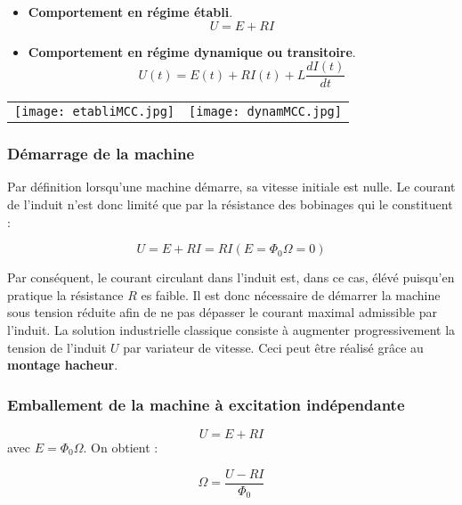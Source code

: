 \documentclass{article}
\begin{document}
\begin{itemize}
    \item \textbf{Comportement en régime établi}. 
    \begin{equation}
        U = E + RI
    \end{equation}
    \item \textbf{Comportement en régime dynamique ou transitoire}. 
    \begin{equation}
        U(t) = E(t) + RI(t) + L \frac{dI (t)}{dt}
    \end{equation}
\end{itemize}


\begin{tabular}{cc}
   \texttt{[image: etabliMCC.jpg]} &
   \texttt{[image: dynamMCC.jpg]} \\
\end{tabular}



\subsubsection{Démarrage de la machine}

Par définition lorsqu'une machine démarre, sa vitesse initiale est nulle. Le courant de l'induit n'est donc limité que par la résistance des bobinages qui le constituent :

\begin{equation}
    U = E + RI = RI (E=\Phi_0\Omega=0)
\end{equation}

Par conséquent, le courant circulant dans l'induit est, dans ce cas, élévé puisqu'en pratique la résistance $R$ es faible. Il est donc nécessaire de démarrer la machine sous tension réduite afin de ne pas dépasser le courant maximal admissible par l'induit. La solution industrielle classique consiste à augmenter progressivement la tension de l'induit $U$ par variateur de vitesse. Ceci peut être réalisé grâce au \textbf{montage hacheur}.

\subsubsection{Emballement de la machine à excitation indépendante}

\begin{equation}
    U = E + RI
\end{equation}
avec $E=\Phi_0 \Omega$. On obtient :

\begin{equation}
    \Omega = \frac{U - RI}{\Phi_0}
\end{equation}
\end{document}
